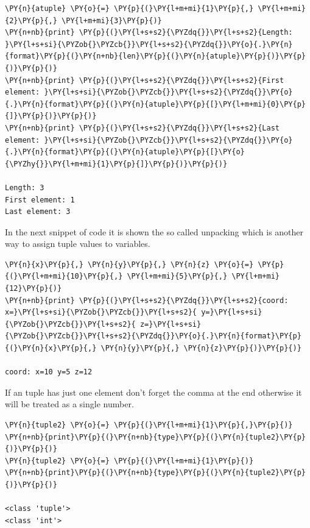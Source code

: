 \begin{tcolorbox}[breakable, size=fbox, boxrule=1pt, pad at break*=1mm, colback=cellbackground, colframe=cellborder]
\begin{Verbatim}[commandchars=\\\{\}]
\PY{n}{atuple} \PY{o}{=} \PY{p}{(}\PY{l+m+mi}{1}\PY{p}{,} \PY{l+m+mi}{2}\PY{p}{,} \PY{l+m+mi}{3}\PY{p}{)}
\PY{n+nb}{print} \PY{p}{(}\PY{l+s+s2}{\PYZdq{}}\PY{l+s+s2}{Length: }\PY{l+s+si}{\PYZob{}\PYZcb{}}\PY{l+s+s2}{\PYZdq{}}\PY{o}{.}\PY{n}{format}\PY{p}{(}\PY{n+nb}{len}\PY{p}{(}\PY{n}{atuple}\PY{p}{)}\PY{p}{)}\PY{p}{)}
\PY{n+nb}{print} \PY{p}{(}\PY{l+s+s2}{\PYZdq{}}\PY{l+s+s2}{First element: }\PY{l+s+si}{\PYZob{}\PYZcb{}}\PY{l+s+s2}{\PYZdq{}}\PY{o}{.}\PY{n}{format}\PY{p}{(}\PY{n}{atuple}\PY{p}{[}\PY{l+m+mi}{0}\PY{p}{]}\PY{p}{)}\PY{p}{)}
\PY{n+nb}{print} \PY{p}{(}\PY{l+s+s2}{\PYZdq{}}\PY{l+s+s2}{Last element: }\PY{l+s+si}{\PYZob{}\PYZcb{}}\PY{l+s+s2}{\PYZdq{}}\PY{o}{.}\PY{n}{format}\PY{p}{(}\PY{n}{atuple}\PY{p}{[}\PY{o}{\PYZhy{}}\PY{l+m+mi}{1}\PY{p}{]}\PY{p}{)}\PY{p}{)}

Length: 3
First element: 1
Last element: 3
\end{Verbatim}
\end{tcolorbox}

In the next snippet of code it is shown the so called unpacking which is another way to assign tuple values to variables.

\begin{tcolorbox}[breakable, size=fbox, boxrule=1pt, pad at break*=1mm, colback=cellbackground, colframe=cellborder]
\begin{Verbatim}[commandchars=\\\{\}]
\PY{n}{x}\PY{p}{,} \PY{n}{y}\PY{p}{,} \PY{n}{z} \PY{o}{=} \PY{p}{(}\PY{l+m+mi}{10}\PY{p}{,} \PY{l+m+mi}{5}\PY{p}{,} \PY{l+m+mi}{12}\PY{p}{)}
\PY{n+nb}{print} \PY{p}{(}\PY{l+s+s2}{\PYZdq{}}\PY{l+s+s2}{coord: x=}\PY{l+s+si}{\PYZob{}\PYZcb{}}\PY{l+s+s2}{ y=}\PY{l+s+si}{\PYZob{}\PYZcb{}}\PY{l+s+s2}{ z=}\PY{l+s+si}{\PYZob{}\PYZcb{}}\PY{l+s+s2}{\PYZdq{}}\PY{o}{.}\PY{n}{format}\PY{p}{(}\PY{n}{x}\PY{p}{,} \PY{n}{y}\PY{p}{,} \PY{n}{z}\PY{p}{)}\PY{p}{)}

coord: x=10 y=5 z=12
\end{Verbatim}
\end{tcolorbox}

If an tuple has just one element don't forget the comma at the end otherwise it will be 
treated as a single number.

\begin{tcolorbox}[breakable, size=fbox, boxrule=1pt, pad at break*=1mm, colback=cellbackground, colframe=cellborder]
\begin{Verbatim}[commandchars=\\\{\}]
\PY{n}{tuple2} \PY{o}{=} \PY{p}{(}\PY{l+m+mi}{1}\PY{p}{,}\PY{p}{)}
\PY{n+nb}{print}\PY{p}{(}\PY{n+nb}{type}\PY{p}{(}\PY{n}{tuple2}\PY{p}{)}\PY{p}{)}
\PY{n}{tuple2} \PY{o}{=} \PY{p}{(}\PY{l+m+mi}{1}\PY{p}{)}
\PY{n+nb}{print}\PY{p}{(}\PY{n+nb}{type}\PY{p}{(}\PY{n}{tuple2}\PY{p}{)}\PY{p}{)}

<class 'tuple'>
<class 'int'>
\end{Verbatim}
\end{tcolorbox}

